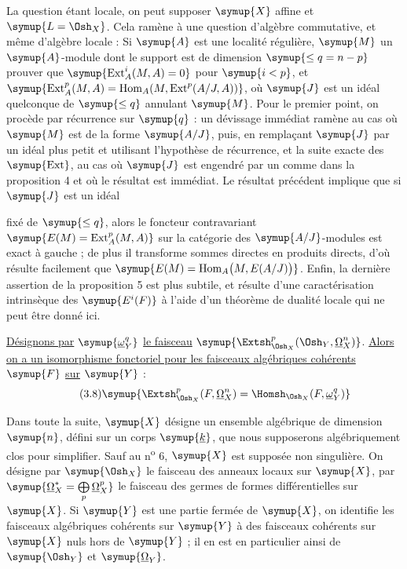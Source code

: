 La question étant locale, on peut supposer $\symup{X}$ affine et $\symup{L=\Osh_X}$. Cela ramène
à une question d'algèbre commutative, et même d'algèbre locale : Si $\symup{A}$ est une
localité régulière, $\symup{M}$ un $\symup{A}$-module dont le support est de dimension
$\symup{\leq q=n-p}$ prouver que $\symup{\operatorname{Ext}_{A}^{i}(M,A)=0}$ pour $\symup{i<p}$, et
$\symup{\operatorname{Ext}_{A}^{p}(M,A)
=\operatorname{Hom}_{A}\!\left(M,\operatorname{Ext}^{p}(A/J,A)\right)}$,
où $\symup{J}$ est un idéal quelconque de  $\symup{\leq q}$ annulant $\symup{M}$. Pour le
premier point, on procède par récurrence sur $\symup{q}$ : un dévissage immédiat ramène
au cas où $\symup{M}$ est de la forme $\symup{A/J}$, puis, en remplaçant $\symup{J}$ par un idéal plus
petit et utilisant l'hypothèse de récurrence, et la suite exacte des
$\symup{\operatorname{Ext}}$, au cas où $\symup{J}$ est engendré par un 
comme dans la proposition 4 et où le résultat est immédiat. Le résultat
précédent implique que si $\symup{J}$ est un idéal

fixé de  $\symup{\leq q}$, alors le foncteur contravariant
$\symup{E(M)=\operatorname{Ext}_{A}^{p}(M,A)}$ sur la catégorie des $\symup{A/J}$-modules est
exact à gauche ; de plus il transforme sommes directes en produits directs,
d'où résulte facilement que
$\symup{E(M)=\operatorname{Hom}_{A}\bigl(M,E(A/J)\bigr)}$.
 Enfin, la
dernière assertion de la proposition 5 est plus subtile, et résulte d'une
caractérisation intrinsèque des $\symup{E^{i}(F)}$ à l'aide d'un théorème de dualité
locale qui ne peut être donné ici.

 \uline{Désignons par} $\symup{\underline{\omega}_Y^{q}}$ \uline{le faisceau}
$\symup{\Extsh_{\Osh_X}^{p}(\Osh_Y,\underline{\Omega}_X^{n})}$. \uline{Alors on a un isomorphisme
fonctoriel pour les faisceaux algébriques cohérents} $\symup{F}$ \uline{sur} $\symup{Y}$ :
\begin{equation}\tag{3.8}
  \symup{\Extsh_{\Osh_X}^{p}(F,\underline{\Omega}_X^{n})
  =\Homsh_{\Osh_X}(F,\underline{\omega}_Y^{q})}
\end{equation}


Dans toute la suite, $\symup{X}$ désigne un ensemble algébrique de dimension $\symup{n}$, défini
sur un corps $\symup{\underline{k}}$, que nous supposerons algébriquement clos pour simplifier. Sauf
au n\textsuperscript{o} 6, $\symup{X}$ est supposée non singulière. On désigne par
$\symup{\Osh_X}$ le faisceau des anneaux locaux sur $\symup{X}$, par
$\symup{\underline{\Omega}_X^{*}=\bigoplus\limits_p\underline{\Omega}_X^{p}}$ le faisceau des germes de formes différentielles sur $\symup{X}$. Si $\symup{Y}$ est une partie fermée de $\symup{X}$, on identifie
les faisceaux algébriques cohérents sur $\symup{Y}$ à des faisceaux cohérents sur $\symup{X}$
nuls hors de $\symup{Y}$ ; il en est en particulier ainsi de $\symup{\Osh_Y}$ et $\symup{\underline{\Omega}_Y}$.

